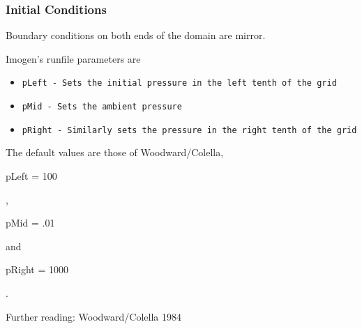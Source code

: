 \subsubsection{Initial Conditions}

Boundary conditions on both ends of the domain are mirror.

Imogen's runfile parameters are
\begin{itemize}
\item \tt{pLeft} - Sets the initial pressure in the left tenth of the grid
\item \tt{pMid} - Sets the ambient pressure
\item \tt{pRight} - Similarly sets the pressure in the right tenth of the grid
\end{itemize}

The default values are those of Woodward/Colella, \begin{tt}pLeft = 100\end{tt}, \begin{tt}pMid = .01\end{tt}
and \begin{tt}pRight = 1000\end{tt}.

Further reading:
Woodward/Colella 1984
